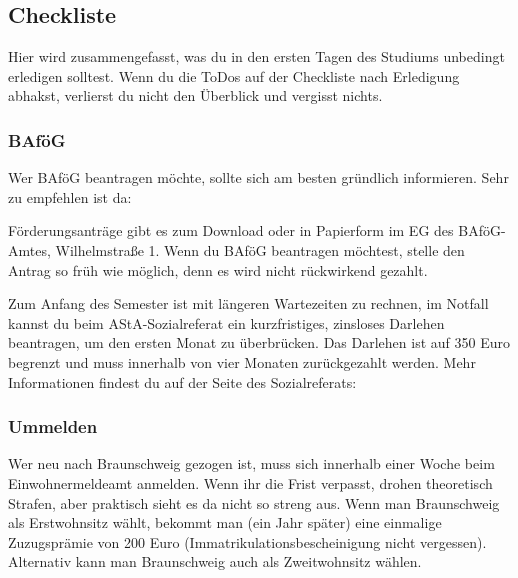 
\subsection{Checkliste}
\label{checkliste}
	Hier wird zusammengefasst, was du in den ersten Tagen des Studiums unbedingt erledigen solltest. Wenn du die ToDos auf der Checkliste nach Erledigung abhakst, verlierst du nicht den Überblick und vergisst nichts.
	
\vspace*{0.5cm}


\begin{multicols}{2}

\subsubsection{BAföG}
	\label{todobafoeg}

	Wer BAföG beantragen möchte, sollte sich am besten gründlich informieren. Sehr zu empfehlen ist da: \\
 
	Förderungsanträge gibt es zum Download oder in Papierform im EG des BAföG-Amtes, Wilhelmstraße 1. Wenn du BAföG beantragen möchtest, stelle den Antrag so früh wie möglich, denn es wird nicht rückwirkend gezahlt.

	Zum Anfang des Semester ist mit längeren Wartezeiten zu rechnen, im Notfall kannst du beim AStA-Sozialreferat ein kurzfristiges, zinsloses Darlehen beantragen, um den ersten Monat zu überbrücken. Das Darlehen ist auf 350 Euro begrenzt und muss innerhalb von vier Monaten zurückgezahlt werden. Mehr Informationen findest du auf der Seite des Sozialreferats: 


\subsubsection{Ummelden}
	\label{todoummelden}

	Wer neu nach Braunschweig gezogen ist, muss sich innerhalb einer Woche beim Einwohnermeldeamt anmelden. Wenn ihr die Frist verpasst, drohen theoretisch Strafen, aber praktisch sieht es da nicht so streng aus. Wenn man Braunschweig als Erstwohnsitz wählt, bekommt man (ein Jahr später) eine einmalige Zuzugsprämie von 200 Euro (Immatrikulationsbescheinigung nicht vergessen). Alternativ kann man Braunschweig auch als Zweitwohnsitz wählen.


\end{multicols}
